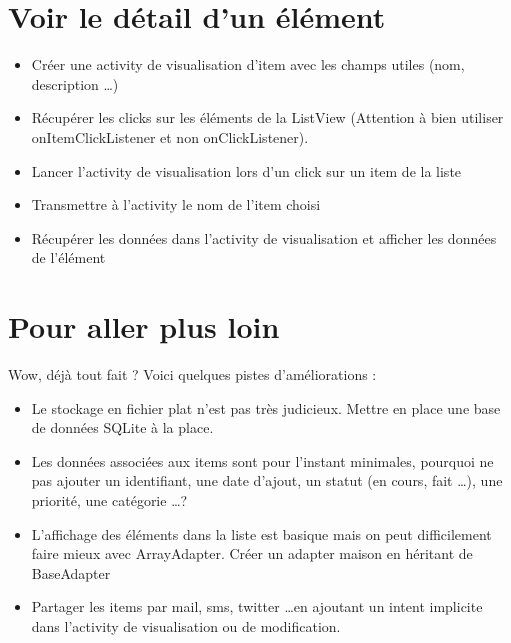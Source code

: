\documentclass{article}
\begin{document}
 \section{Voir le détail d'un élément}
 \begin{itemize}
  \item Créer une activity de visualisation d'item avec les champs utiles (nom, description \ldots)
  \item Récupérer les clicks sur les éléments de la ListView (Attention à bien utiliser onItemClickListener et non onClickListener).
  \item Lancer l'activity de visualisation lors d'un click sur un item de la liste
  \item Transmettre à l'activity le nom de l'item choisi
  \item Récupérer les données dans l'activity de visualisation et afficher les
  données de l'élément
 \end{itemize}
 \section{Pour aller plus loin}
	Wow, déjà tout fait ? Voici quelques pistes d'améliorations :
  \begin{itemize}
  \item Le stockage en fichier plat n'est pas très judicieux. Mettre en place une base de données SQLite à la place.
  \item Les données associées aux items sont pour l'instant minimales, pourquoi ne pas ajouter un identifiant, une date d'ajout, un statut (en cours, fait \ldots), une priorité, une catégorie \ldots ?
  \item L'affichage des éléments dans la liste est basique mais on peut difficilement faire mieux avec ArrayAdapter. Créer un adapter maison en héritant de BaseAdapter
  \item Partager les items par mail, sms, twitter \ldots en ajoutant un intent implicite dans l'activity de visualisation ou de modification.
 \end{itemize}
\end{document}
